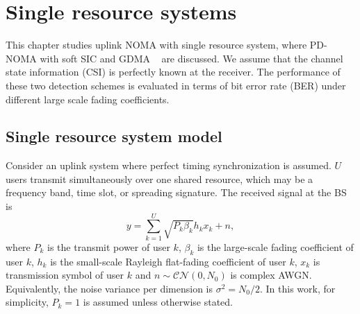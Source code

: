 
\chapter{Single resource systems}
\label{ch:single-resource}
This chapter studies uplink NOMA with single resource system, where PD-NOMA with soft SIC and GDMA ~\cite{hsu2019gain} are discussed. 
We assume that the channel state information (CSI) is perfectly known at the receiver. The performance of these two detection schemes is evaluated in terms of bit error rate (BER) under different large scale fading coefficients.

\section{Single resource system model}
Consider an uplink system where perfect timing synchronization is assumed. $U$ users transmit simultaneously over one shared resource, which may be a frequency band, time slot, or spreading signature. The received signal at the BS is
\begin{equation}
    \label{eq:single_resource_system_model}
    y = \sum_{k=1}^{U} \sqrt{P_k \beta_k} h_k x_k + n,
\end{equation}
where $P_k$ is the transmit power of user $k$, $\beta_k$ is the large-scale fading coefficient of user $k$, $h_k$ is the small-scale Rayleigh flat-fading coefficient of user $k$, $x_k$ is transmission symbol of user $k$ and $n \sim \mathcal{CN}(0,N_0)$ is complex AWGN. 
Equivalently, the noise variance per dimension is $\sigma^2=N_0/2$. 
In this work, for simplicity, $P_k=1$ is assumed unless otherwise stated.

